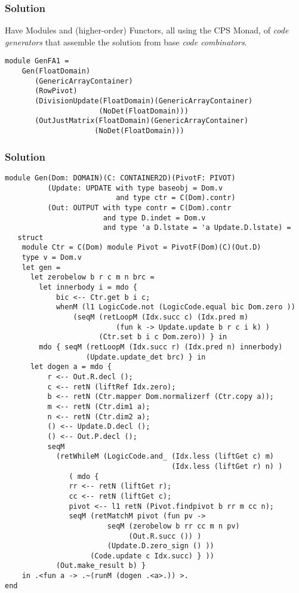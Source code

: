 \documentclass{beamer}
\begin{document}
\begin{frame}[fragile]
    \frametitle{Solution}
    Have Modules and (higher-order) Functors, all using the CPS Monad, of
    \emph{code generators} that assemble the solution from base \emph{code
    combinators}.
\begin{verbatim}
module GenFA1 = 
    Gen(FloatDomain)
       (GenericArrayContainer)
       (RowPivot)
       (DivisionUpdate(FloatDomain)(GenericArrayContainer)
                      (NoDet(FloatDomain)))
       (OutJustMatrix(FloatDomain)(GenericArrayContainer)
                     (NoDet(FloatDomain)))
\end{verbatim}
\end{frame}

\begin{frame}[fragile]
    \frametitle{Solution}
    \begin{small}
\begin{verbatim}
module Gen(Dom: DOMAIN)(C: CONTAINER2D)(PivotF: PIVOT)
          (Update: UPDATE with type baseobj = Dom.v 
                          and type ctr = C(Dom).contr)
          (Out: OUTPUT with type contr = C(Dom).contr 
                       and type D.indet = Dom.v 
                       and type 'a D.lstate = 'a Update.D.lstate) =
   struct
    module Ctr = C(Dom) module Pivot = PivotF(Dom)(C)(Out.D)
    type v = Dom.v
    let gen =
      let zerobelow b r c m n brc =
        let innerbody i = mdo {
            bic <-- Ctr.get b i c;
            whenM (l1 LogicCode.not (LogicCode.equal bic Dom.zero ))
                (seqM (retLoopM (Idx.succ c) (Idx.pred m)
                          (fun k -> Update.update b r c i k) )
                      (Ctr.set b i c Dom.zero)) } in 
        mdo { seqM (retLoopM (Idx.succ r) (Idx.pred n) innerbody) 
                   (Update.update_det brc) } in
      let dogen a = mdo {
          r <-- Out.R.decl ();
          c <-- retN (liftRef Idx.zero);
          b <-- retN (Ctr.mapper Dom.normalizerf (Ctr.copy a));
          m <-- retN (Ctr.dim1 a);
          n <-- retN (Ctr.dim2 a);
          () <-- Update.D.decl ();
          () <-- Out.P.decl ();
          seqM 
            (retWhileM (LogicCode.and_ (Idx.less (liftGet c) m)
                                       (Idx.less (liftGet r) n) )
               ( mdo {
               rr <-- retN (liftGet r);
               cc <-- retN (liftGet c);
               pivot <-- l1 retN (Pivot.findpivot b rr m cc n);
               seqM (retMatchM pivot (fun pv -> 
                        seqM (zerobelow b rr cc m n pv)
                             (Out.R.succ ()) )
                        (Update.D.zero_sign () ))
                    (Code.update c Idx.succ) } ))
            (Out.make_result b) } 
    in .<fun a -> .~(runM (dogen .<a>.)) >.
end
\end{verbatim}
\end{small}
\end{frame}
\end{document}
